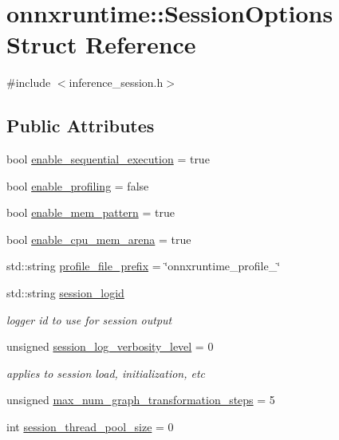 \hypertarget{structonnxruntime_1_1SessionOptions}{}\section{onnxruntime\+:\+:Session\+Options Struct Reference}
\label{structonnxruntime_1_1SessionOptions}


{\ttfamily \#include $<$inference\+\_\+session.\+h$>$}

\subsection*{Public Attributes}
\begin{DoxyCompactItemize}
\item 
bool \mbox{\hyperlink{structonnxruntime_1_1SessionOptions_a3b1010935bafa414ddc0c6cc30d38dd4}{enable\+\_\+sequential\+\_\+execution}} = true
\item 
bool \mbox{\hyperlink{structonnxruntime_1_1SessionOptions_a8dad44784c94dffeb5e6b0ad8ae71217}{enable\+\_\+profiling}} = false
\item 
bool \mbox{\hyperlink{structonnxruntime_1_1SessionOptions_a6a09a03545e143ba21ef53043501cf89}{enable\+\_\+mem\+\_\+pattern}} = true
\item 
bool \mbox{\hyperlink{structonnxruntime_1_1SessionOptions_a2d87c73d16cf7385cf290655ad302d5c}{enable\+\_\+cpu\+\_\+mem\+\_\+arena}} = true
\item 
std\+::string \mbox{\hyperlink{structonnxruntime_1_1SessionOptions_a91dc2f3e2998613a5feb54194f840aa2}{profile\+\_\+file\+\_\+prefix}} = \char`\"{}onnxruntime\+\_\+profile\+\_\+\char`\"{}
\item 
std\+::string \mbox{\hyperlink{structonnxruntime_1_1SessionOptions_acd8193655bc7085dc4bb5c935f945954}{session\+\_\+logid}}
\begin{DoxyCompactList}\small\item\em logger id to use for session output \end{DoxyCompactList}\item 
unsigned \mbox{\hyperlink{structonnxruntime_1_1SessionOptions_aecd03e5fa985dbf78eaecd1a3076ed8c}{session\+\_\+log\+\_\+verbosity\+\_\+level}} = 0
\begin{DoxyCompactList}\small\item\em applies to session load, initialization, etc \end{DoxyCompactList}\item 
unsigned \mbox{\hyperlink{structonnxruntime_1_1SessionOptions_addc80c19c8806fddbfa19eb1141af609}{max\+\_\+num\+\_\+graph\+\_\+transformation\+\_\+steps}} = 5
\item 
int \mbox{\hyperlink{structonnxruntime_1_1SessionOptions_a2d9c6354bb5c16a22d9b27929da5d8b6}{session\+\_\+thread\+\_\+pool\+\_\+size}} = 0
\end{DoxyCompactItemize}


